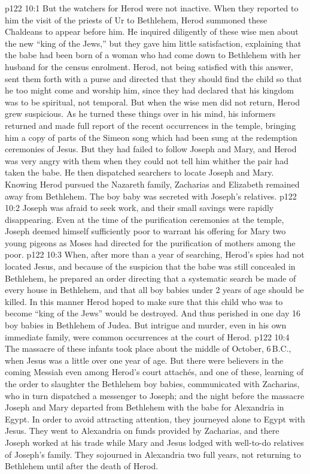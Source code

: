 \vs p122 10:1 But the watchers for Herod were not inactive. When they reported to him the visit of the priests of Ur to Bethlehem, Herod summoned these Chaldeans to appear before him. He inquired diligently of these wise men about the new “king of the Jews,” but they gave him little satisfaction, explaining that the babe had been born of a woman who had come down to Bethlehem with her husband for the census enrolment. Herod, not being satisfied with this answer, sent them forth with a purse and directed that they should find the child so that he too might come and worship him, since they had declared that his kingdom was to be spiritual, not temporal. But when the wise men did not return, Herod grew suspicious. As he turned these things over in his mind, his informers returned and made full report of the recent occurrences in the temple, bringing him a copy of parts of the Simeon song which had been sung at the redemption ceremonies of Jesus. But they had failed to follow Joseph and Mary, and Herod was very angry with them when they could not tell him whither the pair had taken the babe. He then dispatched searchers to locate Joseph and Mary. Knowing Herod pursued the Nazareth family, Zacharias and Elizabeth remained away from Bethlehem. The boy baby was secreted with Joseph’s relatives.
\vs p122 10:2 Joseph was afraid to seek work, and their small savings were rapidly disappearing. Even at the time of the purification ceremonies at the temple, Joseph deemed himself sufficiently poor to warrant his offering for Mary two young pigeons as Moses had directed for the purification of mothers among the poor.
\vs p122 10:3 When, after more than a year of searching, Herod’s spies had not located Jesus, and because of the suspicion that the babe was still concealed in Bethlehem, he prepared an order directing that a systematic search be made of every house in Bethlehem, and that all boy babies under 2 years of age should be killed. In this manner Herod hoped to make sure that this child who was to become “king of the Jews” would be destroyed. And thus perished in one day 16 boy babies in Bethlehem of Judea. But intrigue and murder, even in his own immediate family, were common occurrences at the court of Herod.
\vs p122 10:4 The massacre of these infants took place about the middle of October, 6\,B.C., when Jesus was a little over one year of age. But there were believers in the coming Messiah even among Herod’s court attachés, and one of these, learning of the order to slaughter the Bethlehem boy babies, communicated with Zacharias, who in turn dispatched a messenger to Joseph; and the night before the massacre Joseph and Mary departed from Bethlehem with the babe for Alexandria in Egypt. In order to avoid attracting attention, they journeyed alone to Egypt with Jesus. They went to Alexandria on funds provided by Zacharias, and there Joseph worked at his trade while Mary and Jesus lodged with well\hyp{}to\hyp{}do relatives of Joseph’s family. They sojourned in Alexandria two full years, not returning to Bethlehem until after the death of Herod.
\quizlink
